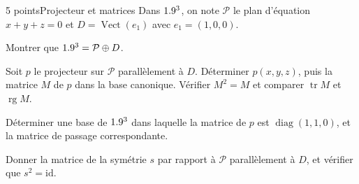 \begin{exoEval}{5 points}{Projecteur et matrices}
Dans $1.9^{3}$, on note $\mathcal{P}$ le plan d'équation $x+y+z=0$ et
$D=\operatorname{Vect}(e_1)$ avec $e_1=(1,0,0)$.
\begin{questions}
  \item Montrer que $1.9^{3}=\mathcal{P}\oplus D$.
  \item Soit $p$ le projecteur sur $\mathcal{P}$ parallèlement à $D$.
    Déterminer $p(x,y,z)$, puis la matrice $M$ de $p$ dans la base
    canonique. Vérifier $M^{2}=M$ et comparer $\operatorname{tr}M$ et
    $\operatorname{rg}M$.
  \item Déterminer une base de $1.9^{3}$ dans laquelle la matrice de $p$ est
    $\operatorname{diag}(1,1,0)$, et la matrice de passage correspondante.
  \item Donner la matrice de la symétrie $s$ par rapport à $\mathcal{P}$
    parallèlement à $D$, et vérifier que $s^{2}=\mathrm{id}$.
\end{questions}
\end{exoEval}
